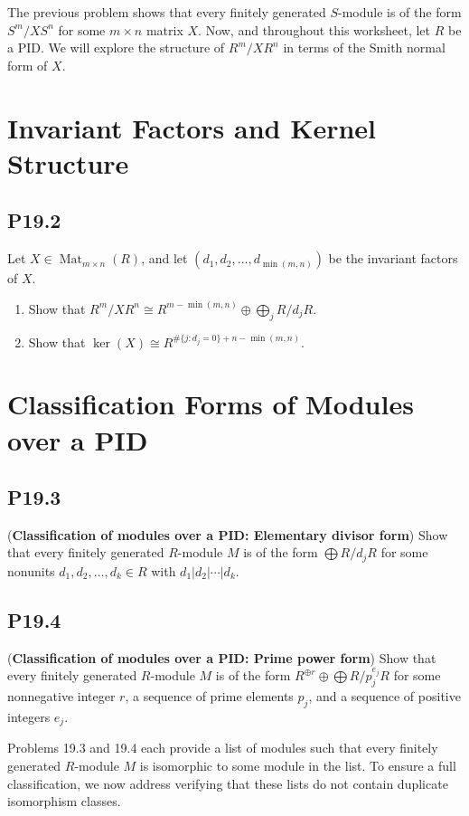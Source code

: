 \documentclass[lang=cn,11pt]{template}
\begin{document}
The previous problem shows that every finitely generated \( S \)-module is of the form \( S^m / X S^n \) for some \( m \times n \) matrix \( X \). Now, and throughout this worksheet, let \( R \) be a PID. We will explore the structure of \( R^m / X R^n \) in terms of the Smith normal form of \( X \).

\section{Invariant Factors and Kernel Structure}

\subsection*{P19.2} Let \( X \in \operatorname{Mat}_{m \times n}(R) \), and let \( (d_1, d_2, \dots, d_{\min(m,n)}) \) be the invariant factors of \( X \).
\begin{enumerate}
    \item Show that \( R^m / X R^n \cong R^{m - \min(m,n)} \oplus \bigoplus_j R / d_j R \).
    \item Show that \( \ker(X) \cong R^{\#\{j : d_j = 0\} + n - \min(m,n)} \).
\end{enumerate}

\section{Classification Forms of Modules over a PID}

\subsection*{P19.3} (\textbf{Classification of modules over a PID: Elementary divisor form}) Show that every finitely generated \( R \)-module \( M \) is of the form \( \bigoplus R / d_j R \) for some nonunits \( d_1, d_2, \dots, d_k \in R \) with \( d_1 | d_2 | \cdots | d_k \).

\subsection*{P19.4} (\textbf{Classification of modules over a PID: Prime power form}) Show that every finitely generated \( R \)-module \( M \) is of the form \( R^{\oplus r} \oplus \bigoplus R / p_j^{e_j} R \) for some nonnegative integer \( r \), a sequence of prime elements \( p_j \), and a sequence of positive integers \( e_j \).

Problems 19.3 and 19.4 each provide a list of modules such that every finitely generated \( R \)-module \( M \) is isomorphic to some module in the list. To ensure a full classification, we now address verifying that these lists do not contain duplicate isomorphism classes.
\end{document}
